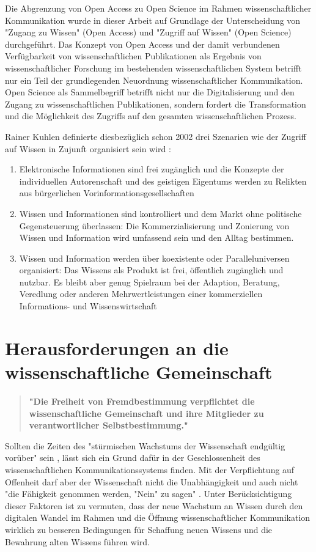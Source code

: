 Die Abgrenzung von Open Access zu Open Science im Rahmen wissenschaftlicher Kommunikation wurde in dieser Arbeit auf Grundlage der Unterscheidung von "Zugang zu Wissen" (Open Access) und "Zugriff auf Wissen" (Open Science) durchgeführt. Das Konzept von Open Access und der damit verbundenen Verfügbarkeit von wissenschaftlichen Publikationen als Ergebnis von wissenschaftlicher Forschung im bestehenden wissenschaftlichen System betrifft nur ein Teil der grundlegenden Neuordnung wissenschaftlicher Kommunikation. Open Science als Sammelbegriff betrifft nicht nur die Digitalisierung und den Zugang zu wissenschaftlichen Publikationen, sondern fordert die Transformation und die Möglichkeit des Zugriffs auf den gesamten wissenschaftlichen Prozess.

Rainer Kuhlen definierte diesbezüglich schon 2002 drei Szenarien wie der Zugriff auf Wissen in Zujunft organisiert sein wird \cite{Kuhlen_2002_universalaccess}:
\begin{enumerate}
\item Elektronische Informationen sind frei zugänglich und die Konzepte der individuellen Autorenschaft und des geistigen Eigentums werden zu Relikten aus bürgerlichen Vorinformationsgesellschaften
\item Wissen und Informationen sind kontrolliert und dem Markt ohne politische Gegensteuerung überlassen: Die Kommerzialisierung und Zonierung von Wissen und Information wird umfassend sein und den Alltag bestimmen.
\item Wissen und Information werden über koexistente oder Paralleluniversen organisiert: Das Wissens als Produkt ist frei, öffentlich zugänglich und nutzbar. Es bleibt aber genug Spielraum bei der Adaption, Beratung, Veredlung oder anderen Mehrwertleistungen einer kommerziellen Informations- und Wissenswirtschaft
\end{enumerate}

\section{Herausforderungen an die wissenschaftliche Gemeinschaft}

\begin{quote}
\textbf{"Die Freiheit von Fremdbestimmung verpflichtet die wissenschaftliche Gemeinschaft und ihre Mitglieder zu verantwortlicher Selbstbestimmung."}
\end{quote} \cite{Oezmen_2015}

Sollten die Zeiten des "stürmischen Wachstums der Wissenschaft endgültig vorüber" sein \cite{K_lbel_2002}, lässt sich ein Grund dafür in der Geschlossenheit des wissenschaftlichen Kommunikationssystems finden. Mit der Verpflichtung auf Offenheit darf aber der Wissenschaft nicht die Unabhängigkeit und auch nicht "die Fähigkeit genommen werden, "Nein" zu sagen" \cite{suchen_Hornbostel_2006}. Unter Berücksichtigung dieser Faktoren ist zu vermuten, dass der neue Wachstum an Wissen durch den digitalen Wandel im Rahmen und die Öffnung wissenschaftlicher Kommunikation wirklich zu besseren Bedingungen für Schaffung neuen Wissens und die Bewahrung alten Wissens führen wird.

